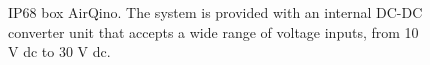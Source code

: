 \documentclass[journal]{IEEEtran}
\begin{document}
\begin{figure}[tbp] 
	\centering
	\hfill
	\caption{IP68 box AirQino. The system is provided with an internal DC-DC converter unit that accepts a wide range of voltage inputs, from 10 V dc to 30 V dc.}
	\label{fig:ip68_image}
\end{figure} 
    
\end{document}
